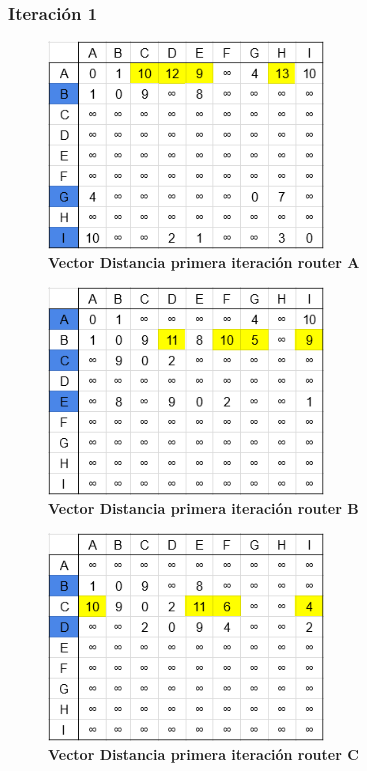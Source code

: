\documentclass[12pt]{article}
\begin{document}
\subsubsection{Iteración 1}

\begin{figure}[H] 
\centering 
\includegraphics[width=0.65\textwidth]{imagenes/2A1.png} \caption{\small \textbf{Vector Distancia primera iteración router A}}
\label{fig:diagrama_17} 
\end{figure}
\begin{figure}[H] 
\centering 
\includegraphics[width=0.65\textwidth]{imagenes/2B1.png} \caption{\small \textbf{Vector Distancia primera iteración router B}}
\label{fig:diagrama_18} 
\end{figure}
\begin{figure}[H] 
\centering 
\includegraphics[width=0.65\textwidth]{imagenes/2C1.png} \caption{\small \textbf{Vector Distancia primera iteración router C}}
\label{fig:diagrama_19} 
\end{figure}
\end{document}
